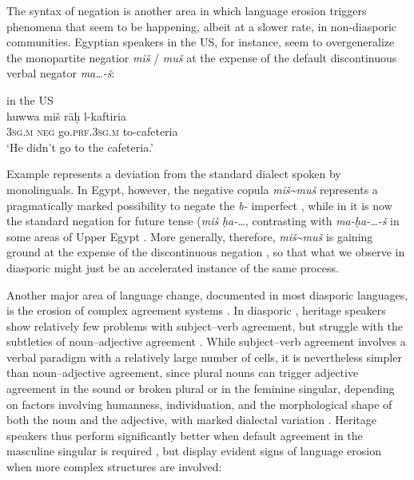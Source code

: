 \documentclass[output=paper]{langsci/langscibook}
\begin{document}
The syntax of {negation} is another area in which {language erosion} triggers phenomena that seem to be happening, albeit at a slower rate, in non-diasporic communities. Egyptian speakers in the US, for instance, seem to overgeneralize the monopartite negatior \textit{miš} / \textit{muš} at the expense of the default discontinuous verbal negator \textit{ma…-š}: 

\ea\label{owens:egy}
{ in the US \citep[482]{AlbiriniBenmamoun2015}}\\
\gll huwwa miš rāḥ l-kaftiria\\
     \textsc{3sg.m} \textsc{neg} go.\textsc{prf.3sg.m} to-cafeteria\\
\glt `He didn’t go to the cafeteria.'
\z

Example  represents a deviation from the standard  dialect spoken by monolinguals. In Egypt, however, the negative {copula} \textit{miš{\textasciitilde}muš} represents a pragmatically marked possibility to negate the \textit{b-} imperfect \citep[302]{Brustad2000}, while in  it is now the standard {negation} for {future} {tense} (\textit{miš} \textit{ḥa-…}, contrasting with \textit{ma-ḥa-…-š} in some areas of Upper Egypt \citep[285]{Brustad2000}. More generally, therefore,  \textit{miš{\textasciitilde}muš} is gaining ground at the expense of the discontinuous {negation} \citep[285]{Brustad2000}, so that what we observe in diasporic  might just be an accelerated instance of the same process.

Another major area of {language change}, documented in most diasporic languages, is the erosion of complex {agreement} systems \citep[192]{GonzoSaltarelli1983}. In diasporic , {heritage speakers} show relatively few problems with subject–verb {agreement}, but struggle with the subtleties of noun–adjective {agreement} \citep[8]{AlbiriniChakrani2013}. While subject--verb {agreement} involves a verbal paradigm with a relatively large number of cells, it is nevertheless simpler than noun–adjective {agreement}, since plural nouns can trigger adjective {agreement} in the sound or {broken plural} or in the feminine singular, depending on factors involving humanness, individuation, and the morphological shape of both the noun and the adjective, with marked dialectal variation \citep[103–104]{Danna2017article}. Heritage speakers thus perform significantly better when default {agreement} in the masculine singular is required \citep[8]{AlbiriniChakrani2013}, but display evident signs of {language erosion} when more complex structures are involved: 
\end{document}

